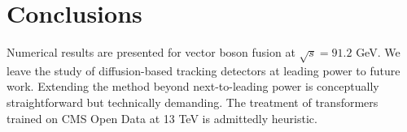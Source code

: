\section{Conclusions}\label{sec:conclusions}

Numerical results are presented for vector boson fusion at $\sqrt{s} =
91.2$ GeV. We leave the study of diffusion-based tracking detectors at
leading power to future work. Extending the method beyond
next-to-leading power is conceptually straightforward but technically
demanding. The treatment of transformers trained on CMS Open Data at 13
TeV is admittedly heuristic.

